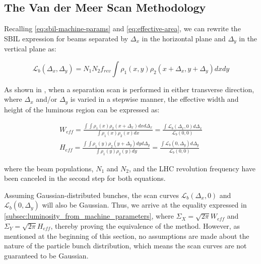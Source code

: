 \subsection{The Van der Meer Scan Methodology}
\label{subsec:the_van_der_meer_scan_methodology}

Recalling \autoref{eq:sbil-machine-params} and \autoref{eq:effective-area}, we can rewrite the SBIL expression for beams separated by $\Delta_x$ in the horizontal plane and $\Delta_y$ in the vertical plane as:

\begin{equation}
    \label{eq:sbil_separating_planes}
    \mathcal{L}_b \left( \Delta_x, \Delta_y \right) = N_1 N_2 f_{rev} \int \rho_1 (x, y) \rho_2 (x + \Delta_x, y + \Delta_y) dx dy
\end{equation}

As shown in \cite{vanderMeer:296752}, when a separation scan is performed in either transverse direction, where $\Delta_x$ and/or $\Delta_y$ is varied in a stepwise manner, the effective width and height of the luminous region can be expressed as:

\begin{equation}
    \begin{aligned}
        \label{eq:effective_width_height_scan}
        W_{eff} = \frac{\int \int \rho_1 (x) \rho_2 (x + \Delta_x) dx d\Delta_x}{\int \rho_1 (x) \rho_2 (x) dx} = \frac{\int \mathcal{L}_b \left( \Delta_x, 0 \right) d\Delta_x}{\mathcal{L}_b \left( 0, 0 \right)} \\
        H_{eff} = \frac{\int \int \rho_1 (y) \rho_2 (y + \Delta_y) dy d\Delta_y}{\int \rho_1 (y) \rho_2 (y) dy} = \frac{\int \mathcal{L}_b \left( 0, \Delta_y \right) d\Delta_y}{\mathcal{L}_b \left( 0, 0 \right)}
    \end{aligned}
\end{equation}

where the beam populations, $N_1$ and $N_2$, and the LHC revolution frequency have been canceled in the second step for both equations.

Assuming Gaussian-distributed bunches, the scan curves $\mathcal{L}_b \left( \Delta_x, 0 \right)$ and $\mathcal{L}_b \left( 0, \Delta_y \right)$ will also be Gaussian. Thus, we arrive at the equality expressed in \autoref{subsec:luminosity_from_machine_parameters}, where $\Sigma_X = \sqrt{2\pi} W_{eff}$ and $\Sigma_Y = \sqrt{2\pi} H_{eff}$, thereby proving the equivalence of the method. However, as mentioned at the beginning of this section, no assumptions are made about the nature of the particle bunch distribution, which means the scan curves are not guaranteed to be Gaussian.


